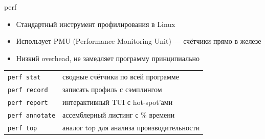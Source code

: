 \documentclass{../../slides-style}
\begin{document}
\begin{frame}{perf}
    \begin{itemize}
        \item Стандартный инструмент профилирования в Linux
        \item Использует PMU (Performance Monitoring Unit) --- счётчики прямо в железе
        \item Низкий overhead, не замедляет программу принципиально
    \end{itemize}

    \bigskip
    \begin{center}
        \begin{tabular}{ll}
            \toprule
            \texttt{perf stat}     & сводные счётчики по всей программе        \\
            \texttt{perf record}   & записать профиль с сэмплингом             \\
            \texttt{perf report}   & интерактивный TUI с hot-spot'ами          \\
            \texttt{perf annotate} & ассемблерный листинг с \% времени         \\
            \texttt{perf top}      & аналог top для анализа производительности \\
            \bottomrule
        \end{tabular}
    \end{center}
\end{frame}
\end{document}
